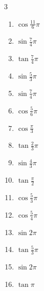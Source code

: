 \begin{multicols}{3}
\begin{enumerate}
  \item $\displaystyle \cos{\frac{11}{6}\pi}$

  \item $\displaystyle \sin{\frac{7}{4}\pi}$

  \item $\displaystyle \tan{\frac{7}{4}\pi}$
        \phantom{$\displaystyle =-1$}

  \item $\displaystyle \sin{\frac{5}{3}\pi}$

  \item $\displaystyle \sin{\frac{7}{4}\pi}$

  \item $\displaystyle \cos{\frac{5}{6}\pi}$

  \item $\displaystyle \cos{\frac{\pi}{3}}$

  \item $\displaystyle \tan{\frac{2}{3}\pi}$

  \item $\displaystyle \sin{\frac{4}{3}\pi}$

  \item $\displaystyle \tan{\frac{\pi}{2}}$
        \phantom{$\displaystyle \quad なし$}

  \item $\displaystyle \cos{\frac{5}{3}\pi}$

  \item $\displaystyle \cos{\frac{5}{4}\pi}$

  \item $\displaystyle \sin{2\pi}$
        \phantom{$\displaystyle =0$}

  \item $\displaystyle \tan{\frac{5}{3}\pi}$

  \item $\displaystyle \sin{2\pi}$
        \phantom{$\displaystyle =0$}

  \item $\displaystyle \tan{\pi}$
        \phantom{$\displaystyle =0$}


\end{enumerate}
\end{multicols}

